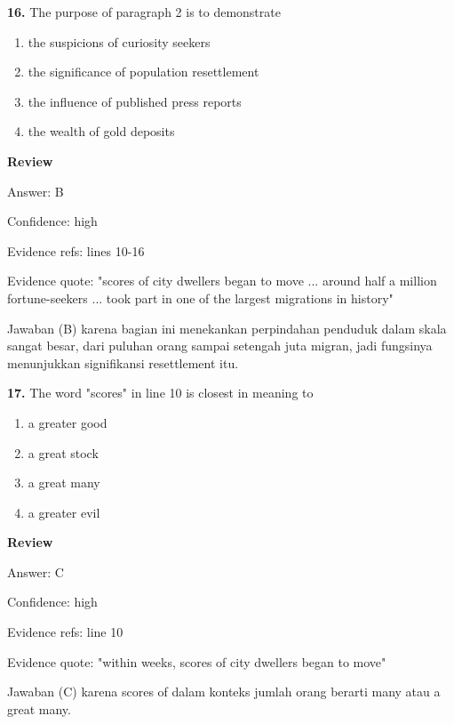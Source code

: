 \documentclass[12pt]{article}
\begin{document}
\vspace{0.25\baselineskip}
\noindent\textbf{16.} The purpose of paragraph 2 is to demonstrate
\begin{enumerate}[label=(\Alph*),leftmargin=*,itemsep=0.2em]
\item the suspicions of curiosity seekers
\item the significance of population resettlement
\item the influence of published press reports
\item the wealth of gold deposits
\end{enumerate}
\par
\begingroup
\setlength{\parskip}{0pt}
\setlength{\parindent}{0pt}
\textbf{Review}\par
Answer: B\par
Confidence: high\par
Evidence refs: lines 10-16\par
Evidence quote: "scores of city dwellers began to move ... around half a million fortune-seekers ... took part in one of the largest migrations in history"\par
Jawaban (B) karena bagian ini menekankan perpindahan penduduk dalam skala sangat besar, dari puluhan orang sampai setengah juta migran, jadi fungsinya menunjukkan signifikansi resettlement itu.\par
\endgroup
\par
\vspace{0.25\baselineskip}
\noindent\textbf{17.} The word "scores" in line 10 is closest in meaning to
\begin{enumerate}[label=(\Alph*),leftmargin=*,itemsep=0.2em]
\item a greater good
\item a great stock
\item a great many
\item a greater evil
\end{enumerate}
\par
\begingroup
\setlength{\parskip}{0pt}
\setlength{\parindent}{0pt}
\textbf{Review}\par
Answer: C\par
Confidence: high\par
Evidence refs: line 10\par
Evidence quote: "within weeks, scores of city dwellers began to move"\par
Jawaban (C) karena scores of dalam konteks jumlah orang berarti many atau a great many.\par
\end{document}
